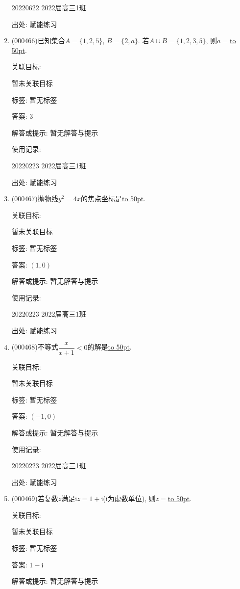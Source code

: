 \documentclass[10pt,a4paper]{article}
\newcommand{\blank}[1]{\underline{\hbox to #1pt{}}}
\begin{document}
\begin{enumerate}[1.]
20220622	2022届高三1班  	


出处: 赋能练习
\item { (000466)}已知集合$A=\{1,2,5\}$, $B=\{2,a\}$. 若$A\cup B=\{1,2,3,5\}$, 则$a=$\blank{50}.


关联目标:

暂未关联目标



标签: 暂无标签

答案: $3$

解答或提示: 暂无解答与提示

使用记录:

20220223	2022届高三1班	


出处: 赋能练习
\item { (000467)}抛物线$y^2=4x$的焦点坐标是\blank{50}.


关联目标:

暂未关联目标



标签: 暂无标签

答案: $(1,0)$

解答或提示: 暂无解答与提示

使用记录:

20220223	2022届高三1班	


出处: 赋能练习
\item { (000468)}不等式$\dfrac x{x+1}<0$的解是\blank{50}.


关联目标:

暂未关联目标



标签: 暂无标签

答案: $(-1,0)$

解答或提示: 暂无解答与提示

使用记录:

20220223	2022届高三1班	


出处: 赋能练习
\item { (000469)}若复数$z$满足$\mathrm{i}z=1+\mathrm{i}$($\mathrm{i}$为虚数单位), 则$z=$\blank{50}.


关联目标:

暂未关联目标



标签: 暂无标签

答案: $1-\mathrm{i}$

解答或提示: 暂无解答与提示


\end{enumerate}
\end{document}
